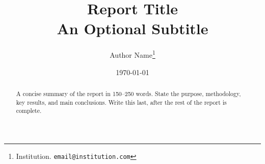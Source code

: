 \documentclass[
  12pt,
  a4paper,
  twoside=false,
]{article}
\title{\textbf{Report Title}\\[0.4em]
       \large An Optional Subtitle}
\author{Author Name\thanks{Institution. \texttt{email@institution.com}}}
\date{\today}
\begin{document}
\maketitle
\thispagestyle{empty}

\begin{abstract}
  \noindent
  A concise summary of the report in 150--250 words. State the purpose,
  methodology, key results, and main conclusions. Write this last, after
  the rest of the report is complete.
\end{abstract}

\newpage
\tableofcontents
\newpage






\newpage
\printbibliography[heading=bibintoc]

% 
\end{document}

